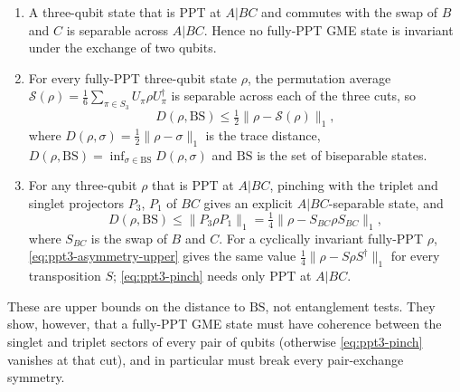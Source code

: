\begin{corollary}\label{cor:ppt3-symmetrisation}
\begin{enumerate}[label=(\alph*)]
\item A three-qubit state that is PPT at $A|BC$ and commutes with the swap of $B$ and $C$ is separable across $A|BC$.
Hence no fully-PPT GME state is invariant under the exchange of two qubits.
\item For every fully-PPT three-qubit state $\rho$, the permutation average
$\mathcal S(\rho)=\frac16\sum_{\pi\in S_3}U_\pi\rho U_\pi^\dagger$ is separable across each of the three cuts, so
\begin{equation}\label{eq:ppt3-asymmetry-upper}
 D(\rho,\mathrm{BS})\le\tfrac12\|\rho-\mathcal S(\rho)\|_1 ,
\end{equation}
where $D(\rho,\sigma)=\frac12\|\rho-\sigma\|_1$ is the trace distance, $D(\rho,\mathrm{BS})=\inf_{\sigma\in\mathrm{BS}}D(\rho,\sigma)$ and
$\mathrm{BS}$ is the set of biseparable states.
\item For any three-qubit $\rho$ that is PPT at $A|BC$, pinching with the triplet and singlet projectors $P_3$, $P_1$ of $BC$
gives an explicit $A|BC$-separable state, and
\begin{equation}\label{eq:ppt3-pinch}
D(\rho,\mathrm{BS})\le\|P_3\rho P_1\|_1=\tfrac14\|\rho-S_{BC}\rho S_{BC}\|_1 ,
\end{equation}
where $S_{BC}$ is the swap of $B$ and $C$. For a cyclically invariant fully-PPT $\rho$, \eqref{eq:ppt3-asymmetry-upper}
gives the same value $\frac14\|\rho-S\rho S^\dagger\|_1$ for every transposition $S$; \eqref{eq:ppt3-pinch} needs only PPT at $A|BC$.
\end{enumerate}
These are upper bounds on the distance to $\mathrm{BS}$, not entanglement tests. They show, however, that a fully-PPT
GME state must have coherence between the singlet and triplet sectors of every pair of qubits (otherwise \eqref{eq:ppt3-pinch} vanishes at that
cut), and in particular must break every pair-exchange symmetry.
\end{corollary}
